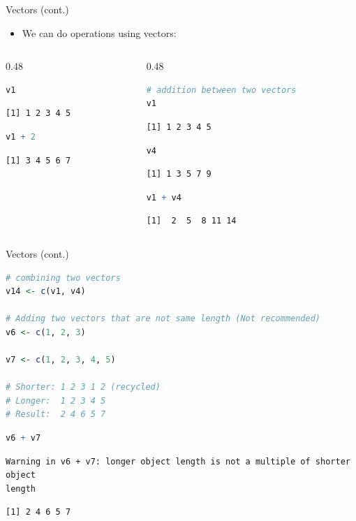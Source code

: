 \begin{frame}[fragile]{Vectors (cont.)}
\begin{itemize}
  \item We can do operations using vectors:
\end{itemize}
\begin{columns}[T]
\begin{column}{0.48\textwidth}
\begin{lstlisting}[language=R]
v1
\end{lstlisting}
\begin{lstlisting}[style=output]
[1] 1 2 3 4 5
\end{lstlisting}
\begin{lstlisting}[language=R]
v1 + 2
\end{lstlisting}
\begin{lstlisting}[style=output]
[1] 3 4 5 6 7
\end{lstlisting}
\end{column}
\begin{column}{0.48\textwidth}
\begin{lstlisting}[language=R]
# addition between two vectors
v1
\end{lstlisting}
\begin{lstlisting}[style=output]
[1] 1 2 3 4 5
\end{lstlisting}
\begin{lstlisting}[language=R]
v4
\end{lstlisting}
\begin{lstlisting}[style=output]
[1] 1 3 5 7 9
\end{lstlisting}
\begin{lstlisting}[language=R]
v1 + v4
\end{lstlisting}
\begin{lstlisting}[style=output]
[1]  2  5  8 11 14
\end{lstlisting}
\end{column}
\end{columns}
\end{frame}

\begin{frame}[fragile]{Vectors (cont.)}
\begin{lstlisting}[language=R]
# combining two vectors
v14 <- c(v1, v4)

# Adding two vectors that are not same length (Not recommended)
v6 <- c(1, 2, 3)

v7 <- c(1, 2, 3, 4, 5)

# Shorter: 1 2 3 1 2 (recycled)
# Longer:  1 2 3 4 5
# Result:  2 4 6 5 7
\end{lstlisting}
\begin{lstlisting}[language=R]
v6 + v7
\end{lstlisting}
\begin{lstlisting}[style=output]
Warning in v6 + v7: longer object length is not a multiple of shorter object
length
\end{lstlisting}
\begin{lstlisting}[style=output]
[1] 2 4 6 5 7
\end{lstlisting}
\end{frame}

